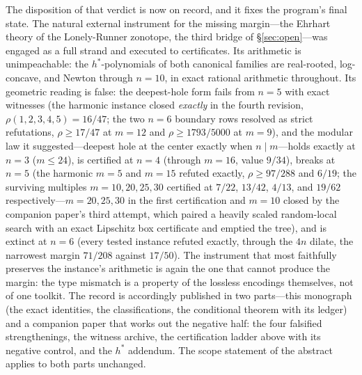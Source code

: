 The disposition of that verdict is now on record, and it fixes the
program's final state. The natural external instrument for the missing
margin---the Ehrhart theory of the Lonely-Runner zonotope, the third
bridge of \S\ref{sec:open}---was engaged as a full strand and executed
to certificates. Its arithmetic is unimpeachable: the $h^*$-polynomials
of both canonical families are real-rooted, log-concave, and Newton
through $n=10$, in exact rational arithmetic throughout. Its geometric
reading is false: the deepest-hole form fails from $n=5$ with exact
witnesses (the harmonic instance closed \emph{exactly} in the fourth
revision, $\rho(1,2,3,4,5)=16/47$; the two $n=6$ boundary rows
resolved as strict refutations, $\rho\ge17/47$ at $m=12$ and
$\rho\ge1793/5000$ at $m=9$),
and the modular law it suggested---deepest hole at the center exactly
when $n\mid m$---holds exactly at $n=3$ ($m\le 24$), is certified at
$n=4$ (through $m=16$, value $9/34$), breaks at $n=5$ (the harmonic
$m=5$ and $m=15$ refuted exactly, $\rho\ge 97/288$ and $6/19$; the
surviving multiples $m=10,20,25,30$ certified at $7/22$, $13/42$,
$4/13$, and $19/62$ respectively---$m=20,25,30$ in the first
certification and $m=10$ closed by the companion paper's
third attempt, which paired a heavily scaled random-local
search with an exact Lipschitz box certificate and emptied the tree),
and is
extinct at $n=6$ (every tested instance refuted exactly, through the
$4n$ dilate, the narrowest margin $71/208$ against $17/50$). The
instrument that most faithfully preserves the instance's arithmetic is
again the one that cannot produce the margin: the type mismatch is a
property of the lossless encodings themselves, not of one toolkit.
The record is accordingly published in two parts---this monograph (the
exact identities, the classifications, the conditional theorem with
its ledger) and a companion paper \cite{companion-paper} that works
out the negative half: the four falsified strengthenings, the witness
archive, the certification ladder above with its negative control, and
the $h^*$ addendum. The scope statement of the abstract applies to
both parts unchanged.
